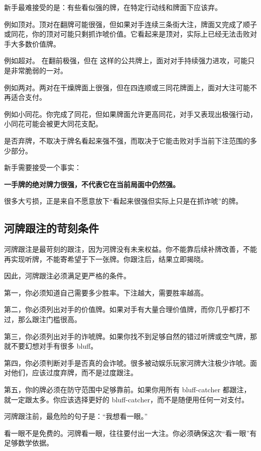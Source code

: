 新手最难接受的是：有些看似强的牌，在特定行动线和牌面下应该弃。

例如顶对。顶对在翻牌可能很强，但如果对手连续三条街大注，牌面又完成了顺子或同花，你的顶对可能只剩抓诈唬价值。它看起来是顶对，实际上已经无法击败对手大多数价值牌。

例如超对。 在翻前极强，但在  这样的公共牌上，面对对手持续强力进攻，可能只是非常脆弱的一对。

例如两对。两对在干燥牌面上很强，但在四连顺或三同花牌面上，面对大注可能不再适合支付。

例如小同花。你完成了同花，但如果牌面允许更高同花，对手又表现出极强行动，小同花可能会被更大同花支配。

是否弃牌，不取决于牌名看起来强不强，而取决于它能击败对手当前下注范围的多少部分。

新手需要接受一个事实：

\begin{center}
\textbf{一手牌的绝对牌力很强，不代表它在当前局面中仍然强。}
\end{center}

很多大亏损，正是来自不愿意放下“看起来很强但实际上只是在抓诈唬”的牌。

\subsection{河牌跟注的苛刻条件}

河牌跟注是最苛刻的跟注，因为河牌没有未来权益。你不能靠后续补牌改善，不能再实现听牌，不能寄希望于下一张牌。你跟注后，结果立即揭晓。

因此，河牌跟注必须满足更严格的条件。

第一，你必须知道自己需要多少胜率。下注越大，需要胜率越高。

第二，你必须列出对手的价值牌。如果对手有大量合理价值牌，而你几乎都打不过，那么跟注门槛很高。

第三，你必须列出对手的诈唬牌。如果你找不到足够自然的错过听牌或空气牌，那就不要幻想对手有很多 bluff。

第四，你必须判断对手是否真的会诈唬。很多被动娱乐玩家河牌大注极少诈唬。面对他们，应该过度弃牌，而不是过度跟注。

第五，你的牌必须在防守范围中足够靠前。如果你用所有 bluff-catcher 都跟注，就一定跟太多。你应该选择更好的 bluff-catcher，而不是随便用任何一对支付。

河牌跟注前，最危险的句子是：“我想看一眼。”

看一眼不是免费的。河牌看一眼，往往要付出一大注。你必须确保这次“看一眼”有足够数学依据。

